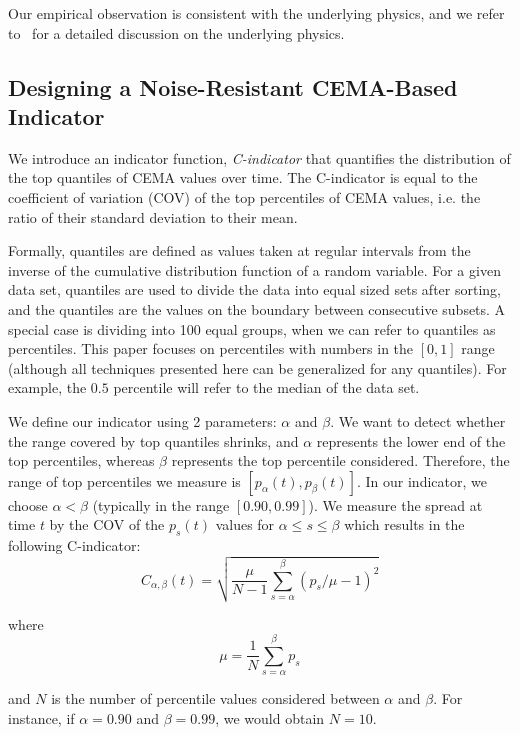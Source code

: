 \documentclass{sig-alternate}
\newcommand{\cmetric}{C}
\newcommand{\pt}{{p}}
\newcommand{\be}{\begin{equation}}
\newcommand{\ee}{\end{equation}}
\begin{document}
Our empirical observation is consistent with the underlying physics, and we refer to~\cite{cema-insitu} for a detailed discussion on  the underlying physics. 

\subsection{Designing a Noise-Resistant CEMA-Based Indicator}
\label{sec:indicator}
We introduce an indicator function, \emph{\cmetric-indicator} that quantifies
the distribution of the top quantiles of CEMA values over time. The
\cmetric-indicator is equal to the coefficient of variation (COV) of the top
percentiles of CEMA values, i.e. the ratio of their standard deviation to
their mean. 

Formally, quantiles are defined as  values taken at regular intervals from the
inverse of the cumulative distribution function of a random variable. For a
given data set, quantiles are used to divide the data into equal sized sets 
after sorting, and the quantiles are the values on the boundary between
consecutive subsets.  A special case is dividing into 100 equal groups, when we can
refer to quantiles as percentiles.  This paper focuses on percentiles with
numbers in the $[0,1]$ range (although all techniques presented here can be
generalized for any quantiles). For example, the $0.5$ percentile will refer to
the median of the data set. 
 
We define our indicator using 2 parameters: $\alpha$ and
$\beta$.  
We  want to detect whether the range
covered by top quantiles shrinks, and $\alpha$ represents the lower end of the
top percentiles, whereas $\beta$ represents the top percentile considered. Therefore, the  range of top percentiles we  measure is
$\left[\pt_\alpha(t), \pt_\beta(t)\right]$.  In our indicator, we choose $\alpha
< \beta$ (typically in the range $[0.90,0.99]$). We measure the spread at time
$t$ by the COV of the $\pt_s(t)$ values for $\alpha \le s \le \beta$ which
results in the following \cmetric-indicator:
\be
\cmetric_{\alpha,\beta}(t) = \sqrt{\frac{\mu}{N-1} \sum_{s=\alpha}^{\beta}
(p_s/\mu - 1)^2}
\label{eq:cmetric}
\ee

\noindent where
\be
\mu = \frac{1}{N} \sum_{s=\alpha}^{\beta} p_s
\label{eq:mu}
\ee

\noindent and $N$ is the number of percentile values considered between $\alpha$ and
$\beta$. For instance, if $\alpha=0.90$ and $\beta=0.99$, we would obtain
$N=10$.
\end{document}
